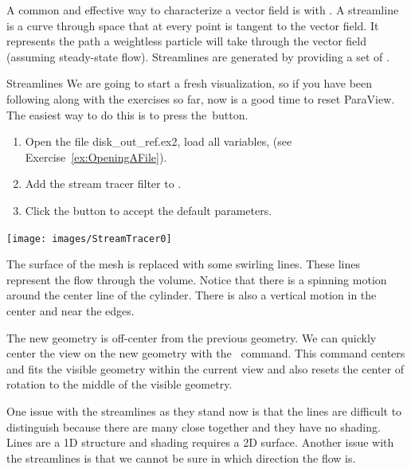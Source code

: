 A common and effective way to characterize a vector field is with
.  A streamline is a curve through space that at every
point is tangent to the vector field.  It represents the path a weightless
particle will take through the vector field (assuming steady-state flow).
Streamlines are generated by providing a set of
 .

\begin{exercise}{Streamlines}
  \label{ex:Streamlines}%
  We are going to start a fresh visualization, so if you have been
  following along with the exercises so far, now is a good time to reset
  ParaView.  The easiest way to do this is to press the~\disconnect button.

  \begin{enumerate}
  \item Open the file disk\_out\_ref.ex2, load all variables, \apply (see
    Exercise~\ref{ex:OpeningAFile}).
  \item Add the stream tracer filter \streamTracer to
    .
  \item Click the \apply button to accept the default parameters.
  \end{enumerate}

  \begin{inlinefig}
    \texttt{[image: images/StreamTracer0]}
  \end{inlinefig}

  The surface of the mesh is replaced with some swirling lines.  These
  lines represent the flow through the volume.  Notice that there is a
  spinning motion around the center line of the cylinder.  There is also a
  vertical motion in the center and near the edges.

  The new geometry is off-center from the previous geometry.  We can
  quickly center the view on the new geometry with the ~\resetCamera command.  This command centers and fits the
  visible geometry within the current view and also resets the center of
  rotation to the middle of the visible geometry.
\end{exercise}

One issue with the streamlines as they stand now is that the lines are
difficult to distinguish because there are many close together and they
have no shading.  Lines are a 1D structure and shading requires a 2D
surface.  Another issue with the streamlines is that we cannot be sure in which
direction the flow is.

